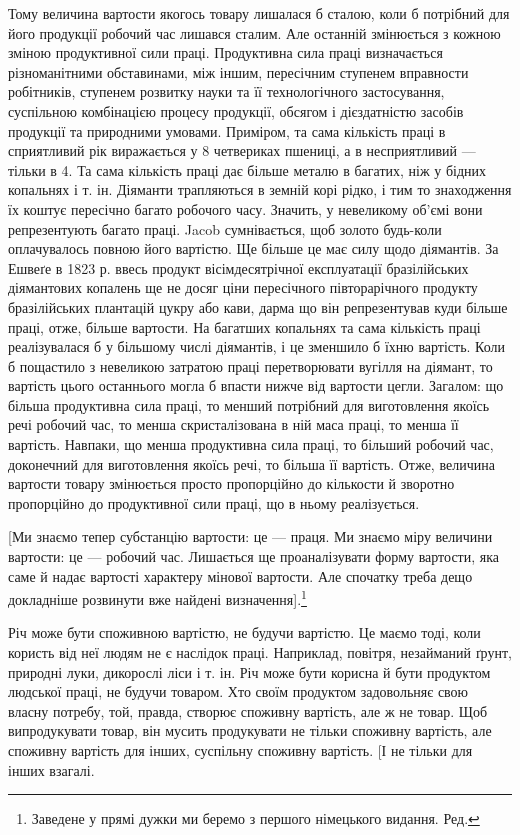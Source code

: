 Тому величина вартости якогось товару лишалася б сталою,
коли б потрібний для його продукції робочий час лишався сталим.
Але останній змінюється з кожною зміною продуктивної
сили праці. Продуктивна сила праці визначається різноманітними
обставинами, між іншим, пересічним ступенем вправности робітників,
ступенем розвитку науки та її технологічного застосування,
суспільною комбінацією процесу продукції, обсягом і дієздатністю
засобів продукції та природними умовами. Приміром, та сама
кількість праці в сприятливий рік виражається у 8 четвериках
пшениці, а в несприятливий — тільки в 4. Та сама кількість праці
дає більше металю в багатих, ніж у бідних копальнях і т. ін.
Діяманти трапляються в земній корі рідко, і тим то знаходження
їх коштує пересічно багато робочого часу. Значить, у невеликому
об’ємі вони репрезентують багато праці. Jacob сумнівається, щоб
золото будь-коли оплачувалось повною його вартістю. Ще
більше це має силу щодо діямантів. За Ешвеґе в 1823 р. ввесь
продукт вісімдесятрічної експлуатації бразілійських діямантових
копалень ще не досяг ціни пересічного півторарічного продукту
бразілійських плантацій цукру або кави, дарма що він репрезентував
куди більше праці, отже, більше вартости. На багатших
копальнях та сама кількість праці реалізувалася б у більшому
числі діямантів, і це зменшило б їхню вартість. Коли б пощастило
з невеликою затратою праці перетворювати вугілля на діямант,
то вартість цього останнього могла б впасти нижче від вартости
цегли. Загалом: що більша продуктивна сила праці, то менший
потрібний для виготовлення якоїсь речі робочий час, то менша
скристалізована в ній маса праці, то менша її вартість. Навпаки,
що менша продуктивна сила праці, то більший робочий час, доконечний
для виготовлення якоїсь речі, то більша її вартість.
Отже, величина вартости товару змінюється просто пропорційно
до кількости й зворотно пропорційно до продуктивної сили праці,
що в ньому реалізується.

[Ми знаємо тепер субстанцію вартости: це — праця. Ми знаємо
міру величини вартости: це — робочий час. Лишається ще проаналізувати
форму вартости, яка саме й надає вартості характеру
мінової вартости. Але спочатку треба дещо докладніше розвинути
вже найдені визначення].\footnote*{
Заведене у прямі дужки ми беремо з першого німецького видання. Ред.
}

Річ може бути споживною вартістю, не будучи вартістю. Це
маємо тоді, коли користь від неї людям не є наслідок праці. Наприклад,
повітря, незайманий ґрунт, природні луки, дикорослі
ліси і т. ін. Річ може бути корисна й бути продуктом людської
праці, не будучи товаром. Хто своїм продуктом задовольняє свою
власну потребу, той, правда, створює споживну вартість, але ж
не товар. Щоб випродукувати товар, він мусить продукувати не
тільки споживну вартість, але споживну вартість для інших,
суспільну споживну вартість. [І не тільки для інших взагалі.
\parbreak{}  %
